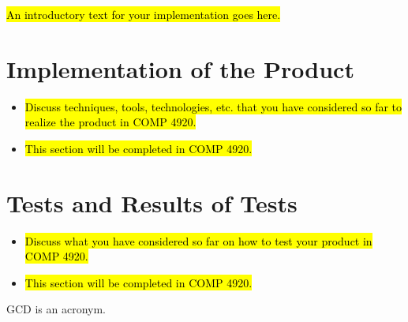 \hl{An introductory text for your implementation goes here.}


\section{Implementation of the Product}

\begin{itemize}
	\item \hl{Discuss techniques, tools, technologies, etc. that you have considered so far to realize the product in COMP 4920.}
	\item \hl{This section will be completed in COMP 4920.}
\end{itemize}




\section{Tests and Results of Tests}

\begin{itemize}
	\item \hl{Discuss what you have considered so far on how to test your product in COMP 4920.}
	\item \hl{This section will be completed in COMP 4920.}
\end{itemize}


\ac{GCD} is an acronym.
